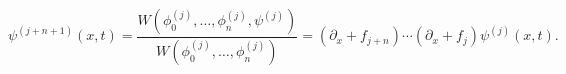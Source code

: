 \begin{equation}\label{crum3}
\psi^{(j+n+1)}(x,t)=\frac{W\left(\phi_0^{(j)},\dots,\phi_n^{(j)},\psi^{(j)}\right)}
{W\left(\phi_0^{(j)},\dots,\phi_n^{(j)}\right)}=
(\partial_x+f_{j+n})\cdots(\partial_x+f_j)\psi^{(j)}(x,t).
\end{equation}

